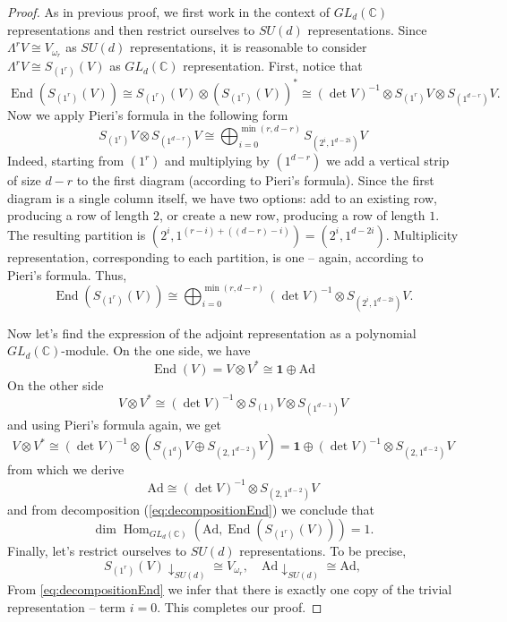 \documentclass[11pt,letterpaper]{article}
\theoremstyle{plain}
\theoremstyle{plain}
\theoremstyle{plain}
\theoremstyle{plain}
\theoremstyle{plain}
\theoremstyle{plain}
\theoremstyle{plain}
\theoremstyle{definition}
\theoremstyle{plain}
\begin{document}
\begin{proof}
As in previous proof, we first work in the context of $GL_d(\mathbb{C})$ representations and then restrict ourselves to $SU(d)$ representations.
Since $\Lambda^r V \cong V_{\omega_r}$ as $SU(d)$ representations, it is reasonable to consider $\Lambda^r V \cong S_{\left(1^r\right)}(V)$ as $GL_d(\mathbb{C})$ representation.
First, notice that
$$
    \operatorname{End}(S_{\left(1^r\right)}(V))\cong S_{\left(1^r\right)}(V) \otimes (S_{\left(1^r\right)}(V))^* \cong (\det V)^{-1} \otimes S_{\left(1^r\right)} V \otimes S_{\left(1^{d-r}\right)} V.
$$
Now we apply Pieri's formula in the following form
\[
S_{\left(1^r\right)} V \otimes S_{\left(1^{d-r}\right)} V \cong \bigoplus_{i=0}^{\min (r, d-r)} S_{\left(2^i, 1^{d-2 i}\right)} V
\]
Indeed, starting from $(1^r)$ and multiplying by $(1^{d-r})$ we add a vertical strip of size $d-r$ to the first diagram (according to Pieri's formula). 
Since the first diagram is a single column itself, we have two options: add to an existing row, producing a row of length $2$, or
create a new row, producing a row of length $1$.
The resulting partition is 
$
\left(2^i, 1^{(r-i)+((d-r)-i)}\right)=\left(2^i, 1^{d-2 i}\right) .
$
Multiplicity representation, corresponding to each partition, is one -- again, according to Pieri's formula.
Thus,
\begin{equation}\label{eq:decompositionEnd}
    \operatorname{End}\left(S_{\left(1^r\right)}(V)\right) \cong \bigoplus_{i=0}^{\min (r, d-r)}(\operatorname{det} V)^{-1} \otimes S_{\left(2^i, 1^{d-2 i}\right)} V.
\end{equation}

Now let's find the expression of the adjoint representation as a polynomial $GL_d(\mathbb{C})$-module. On the one side, we have
\[
    \operatorname{End}(V)=V \otimes V^* \cong \mathbf{1} \oplus \mathrm{Ad}
\]
On the other side
\[
    V \otimes V^* \cong(\operatorname{det} V)^{-1} \otimes S_{\left(1\right)} V \otimes S_{\left(1^{d-1}\right)} V
\]
and using Pieri's formula again, we get
\[
    V \otimes V^* \cong (\operatorname{det} V)^{-1} \otimes \left(S_{\left(1^d\right)} V \oplus S_{\left(2,1^{d-2}\right)} V\right)=\mathbf{1} \oplus(\operatorname{det} V)^{-1} \otimes S_{\left(2,1^{d-2}\right)} V
\]
from which we derive
\[
    \mathrm{Ad} \cong(\operatorname{det} V)^{-1} \otimes S_{\left(2,1^{d-2}\right)} V
\]
and from decomposition (\ref{eq:decompositionEnd}) we conclude that
\[
    \operatorname{dim} \operatorname{Hom}_{GL_d(\mathbb{C})}\left(\mathrm{Ad}, \operatorname{End}\left(S_{\left(1^r\right)}(V)\right)\right)=1 .
\]
Finally, let's restrict ourselves to $SU(d)$ representations. To be precise, 
    \[
        S_{\left(1^r\right)}(V)\downarrow_{SU(d)}\cong V_{\omega_r}, \quad \mathrm{Ad}\downarrow_{SU(d)} \cong \mathrm{Ad},
    \]
From \ref{eq:decompositionEnd} we infer that there is exactly one copy of the trivial representation -- term $i=0$.
This completes our proof.
\end{proof}
\end{document}
